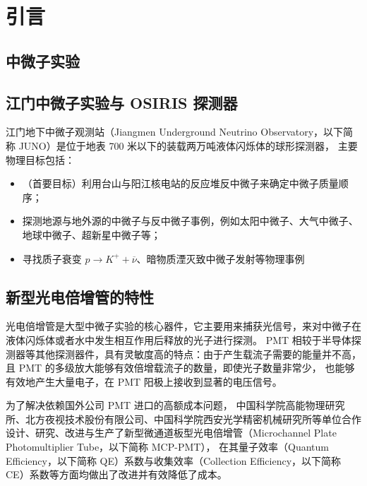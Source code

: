 
\chapter{引言}

\section{中微子实验}

\section{江门中微子实验与 OSIRIS 探测器}
江门地下中微子观测站（Jiangmen Underground Neutrino Observatory，以下简称 JUNO）是位于地表 700 米以下的装载两万吨液体闪烁体的球形探测器，
主要物理目标包括：
\begin{itemize}
    \item （首要目标）利用台山与阳江核电站的反应堆反中微子来确定中微子质量顺序；
    \item 探测地源与地外源的中微子与反中微子事例，例如太阳中微子、大气中微子、地球中微子、超新星中微子等；
    \item 寻找质子衰变 $p\rightarrow K^{+}+\overline{\nu}$、暗物质湮灭致中微子发射等物理事例
\end{itemize}

\section{新型光电倍增管的特性}
光电倍增管是大型中微子实验的核心器件，它主要用来捕获光信号，来对中微子在液体闪烁体或者水中发生相互作用后释放的光子进行探测。
PMT 相较于半导体探测器等其他探测器件，具有灵敏度高的特点：由于产生载流子需要的能量并不高，
且 PMT 的多级放大能够有效倍增载流子的数量，即使光子数量非常少，
也能够有效地产生大量电子，在 PMT 阳极上接收到显著的电压信号。

为了解决依赖国外公司 PMT 进口的高额成本问题，
中国科学院高能物理研究所、北方夜视技术股份有限公司、中国科学院西安光学精密机械研究所等单位合作
设计、研究、改进与生产了新型微通道板型光电倍增管（Microchannel Plate Photomultiplier Tube，以下简称 MCP-PMT），
在其量子效率（Quantum Efficiency，以下简称 QE）系数与收集效率（Collection Efficiency，以下简称 CE）系数等方面均做出了改进并有效降低了成本。

